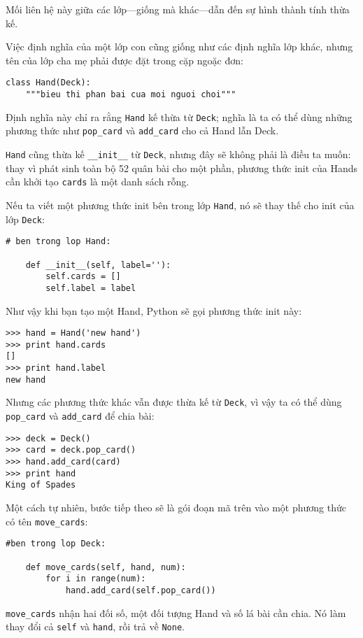 \documentclass[11pt]{book}
\begin{document}
Mối liên hệ này giữa các lớp---giống mà khác---dẫn đến sự hình thành
tính thừa kế.

Việc định nghĩa của một lớp con cũng giống như các định nghĩa lớp khác,
nhưng tên của lớp cha mẹ phải được đặt trong cặp ngoặc đơn:


\beforeverb
\begin{verbatim}
class Hand(Deck):
    """bieu thi phan bai cua moi nguoi choi"""
\end{verbatim}
\afterverb
%
Định nghĩa này chỉ ra rằng {\tt Hand} kế thừa từ {\tt Deck};
nghĩa là ta có thể dùng những phương thức như \verb"pop_card" và \verb"add_card"
cho cả Hand lẫn Deck.

{\tt Hand} cũng thừa kế \verb"__init__" từ {\tt Deck}, nhưng
đây sẽ không phải là điều ta muốn: thay vì phát sinh toàn bộ 
52 quân bài cho một phần, phương thức init của Hands cần khởi tạo
{\tt cards} là một danh sách rỗng.


Nếu ta viết một phương thức init bên trong lớp {\tt Hand}, nó sẽ thay thế
cho init của lớp {\tt Deck}:

\beforeverb
\begin{verbatim}
# ben trong lop Hand:

    def __init__(self, label=''):
        self.cards = []
        self.label = label
\end{verbatim}
\afterverb
%
Như vậy khi bạn tạo một Hand, Python sẽ gọi phương thức init này:

\beforeverb
\begin{verbatim}
>>> hand = Hand('new hand')
>>> print hand.cards
[]
>>> print hand.label
new hand
\end{verbatim}
\afterverb
%
Nhưng các phương thức khác vẫn được thừa kế từ {\tt Deck}, vì vậy ta có thể dùng
\verb"pop_card" và \verb"add_card" để chia bài:

\beforeverb
\begin{verbatim}
>>> deck = Deck()
>>> card = deck.pop_card()
>>> hand.add_card(card)
>>> print hand
King of Spades
\end{verbatim}
\afterverb
%
Một cách tự nhiên, bước tiếp theo sẽ là gói đoạn mã trên vào một
phương thức có tên  \verb"move_cards":


\beforeverb
\begin{verbatim}
#ben trong lop Deck:

    def move_cards(self, hand, num):
        for i in range(num):
            hand.add_card(self.pop_card())
\end{verbatim}
\afterverb
%
\verb"move_cards" nhận hai đối số, một đối tượng Hand và số lá bài
cần chia. Nó làm thay đổi cả  {\tt self} và {\tt hand}, rồi
trả về {\tt None}.
\end{document}
